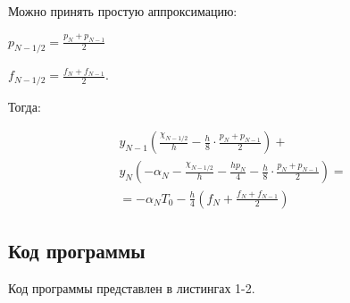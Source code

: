 \documentclass[a4paper,14pt]{article}
\begin{document}
Можно принять простую аппроксимацию:

$p_{N-1/2} = \frac{p_N + p_{N-1}}{2}$

$f_{N-1/2} = \frac{f_N + f_{N-1}}{2}$.

Тогда:

\begin{eqnarray}
	y_{N-1} \left( \frac{\chi_{N-1/2}}{h} - \frac{h}{8} \cdot \frac{p_N + p_{N-1}}{2} \right) + \nonumber \\
	y_N \left( -\alpha_N - \frac{\chi_{N-1/2}}{h} - \frac{hp_N}{4} - \frac{h}{8} \cdot \frac{p_N + p_{N-1}}{2} \right) = \nonumber \\
	= - \alpha_N T_0 - \frac{h}{4} \left( f_N + \frac{f_N + f_{N-1}}{2} \right)
\end{eqnarray}

\subsection*{Код программы}

Код программы представлен в листингах 1-2.
\end{document}

